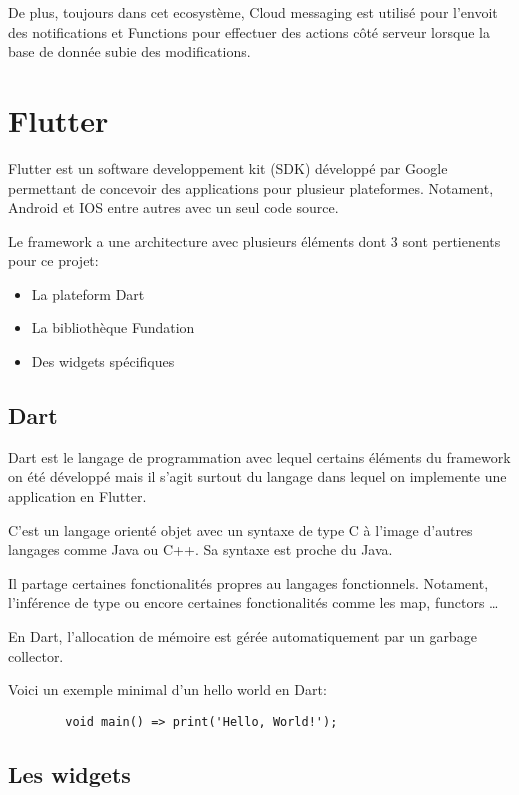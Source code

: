     De plus, toujours dans cet ecosystème, Cloud messaging est utilisé pour l'envoit des notifications et Functions pour 
    effectuer des actions côté serveur lorsque la base de donnée subie des modifications. 

    \section{Flutter}
    Flutter est un software developpement kit (SDK) développé par Google permettant de concevoir
    des applications pour plusieur plateformes. Notament, Android et IOS entre autres avec un seul code source.

    Le framework a une architecture avec plusieurs éléments dont 3 sont pertienents pour ce projet:
    \smallskip
    \begin{itemize}
        \item La plateform Dart
        \item La bibliothèque Fundation
        \item Des widgets spécifiques
    \end{itemize}
    \smallskip
    \subsection*{Dart}
    Dart est le langage de programmation avec lequel certains éléments du framework on été développé mais il s'agit
    surtout du langage dans lequel on implemente une application en Flutter. 

    C'est un langage orienté objet avec un syntaxe de type C à l'image d'autres langages comme Java ou C++.
    Sa syntaxe est proche du Java. 
    
    Il partage certaines fonctionalités propres au langages fonctionnels. Notament, l'inférence de type ou encore
    certaines fonctionalités comme les map, functors \dots

    En Dart, l'allocation de mémoire est gérée automatiquement par un garbage collector. 

    Voici un exemple minimal d'un hello world en Dart:

    \begin{verbatim}
        void main() => print('Hello, World!');
    \end{verbatim}


    \subsection{Les widgets}

